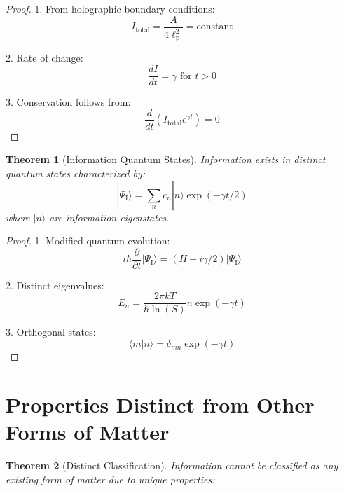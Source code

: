 \documentclass{article}
\newtheorem{theorem}{Theorem}
\begin{document}
\begin{proof}
1. From holographic boundary conditions:
\begin{equation}
I_\text{total} = \frac{A}{4\ell_\text{p}^2} = \text{constant}
\end{equation}

2. Rate of change:
\begin{equation}
\frac{dI}{dt} = \gamma \text{ for } t > 0
\end{equation}

3. Conservation follows from:
\begin{equation}
\frac{d}{dt}(I_\text{total}e^{\gamma t}) = 0
\end{equation}
\end{proof}

\begin{theorem}[Information Quantum States]
Information exists in distinct quantum states characterized by:
\begin{equation}
|\Psi_\text{I}\rangle = \sum_n c_n|n\rangle\exp(-\gamma t/2)
\end{equation}
where $|n\rangle$ are information eigenstates.
\end{theorem}

\begin{proof}
1. Modified quantum evolution:
\begin{equation}
i\hbar\frac{\partial}{\partial t}|\Psi_\text{I}\rangle = (H - i\gamma/2)|\Psi_\text{I}\rangle
\end{equation}

2. Distinct eigenvalues:
\begin{equation}
E_n = \frac{2\pi kT}{\hbar\ln(S)}n\exp(-\gamma t)
\end{equation}

3. Orthogonal states:
\begin{equation}
\langle m|n\rangle = \delta_{mn}\exp(-\gamma t)
\end{equation}
\end{proof}

\section{Properties Distinct from Other Forms of Matter}

\begin{theorem}[Distinct Classification]
Information cannot be classified as any existing form of matter due to unique properties:
\end{theorem}
\end{document}
